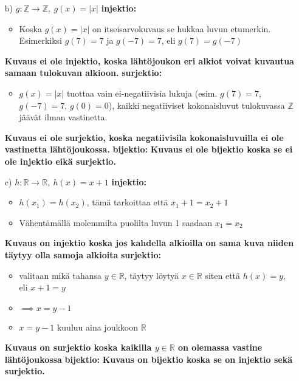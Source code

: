 \documentclass{article}
\begin{document}
\begin{itemize}
            \item[b)] $g : \mathbb{Z} \rightarrow \mathbb{Z}, \ g(x) = |x|$\newline
            \textbf{injektio:}
            \begin{itemize}
                \item Koska $g(x) = |x|$ on itseisarvokuvaus se hukkaa luvun etumerkin. Esimerkiksi $g(7) = 7$ ja $g(-7) = 7$, eli $g(7) = g(-7)$
            \end{itemize}
            \textbf{Kuvaus ei ole injektio, koska lähtöjoukon eri alkiot voivat kuvautua samaan tulokuvan alkioon.}\newline
            \textbf{surjektio:}
            \begin{itemize}
                \item $g(x) = |x|$ tuottaa vain ei-negatiivisia lukuja (esim. $g(7) = 7$, $g(-7) = 7$, $g(0) = 0$), kaikki negatiiviset kokonaisluvut tulokuvassa $\mathbb{Z}$ jäävät ilman vastinetta.
            \end{itemize}
            \textbf{Kuvaus ei ole surjektio, koska negatiivisila kokonaisluvuilla ei ole vastinetta lähtöjoukossa.}\newline
            \textbf{bijektio:}\newline
            \textbf{Kuvaus ei ole bijektio koska se ei ole injektio eikä surjektio.}
\pagebreak
            \item[c)] $h : \mathbb{R} \rightarrow \mathbb{R}, \ h(x) = x + 1$\newline
            \textbf{injektio:}
            \begin{itemize}
                \item $h(x_1) = h(x_2)$, tämä tarkoittaa että $x_1 + 1 = x_2 + 1$
                \item Vähentämällä molemmilta puolilta luvun 1 saadaan $x_1 = x_2$
            \end{itemize}
            \textbf{Kuvaus on injektio koska jos kahdella alkioilla on sama kuva niiden täytyy olla samoja alkioita}\newline
            \textbf{surjektio:}
            \begin{itemize}
                \item valitaan mikä tahansa $y \in \mathbb{R}$, täytyy löytyä $x \in \mathbb{R}$ siten että $h(x) = y$, eli $x + 1 = y$
                \item $\implies x = y - 1$
                \item $x = y - 1$ kuuluu aina joukkoon $\mathbb{R}$
            \end{itemize}
            \textbf{Kuvaus on surjektio koska kaikilla $y \in \mathbb{R}$ on olemassa vastine lähtöjoukossa}\newline
            \textbf{bijektio:}\newline
            \textbf{Kuvaus on bijektio koska se on injektio sekä surjektio.}
        \end{itemize}
    
\end{document}
